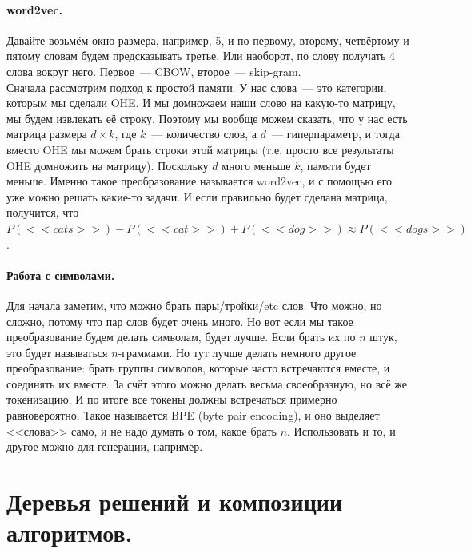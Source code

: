 \documentclass{article}
\begin{document}
    \paragraph{word2vec.}
    Давайте возьмём окно размера, например, 5, и по первому, второму, четвёртому и пятому словам будем предсказывать третье. Или наоборот, по слову получать 4 слова вокруг него. Первое~--- CBOW, второе~--- skip-gram.\\
    Сначала рассмотрим подход к простой памяти. У нас слова~--- это категории, которым мы сделали OHE. И мы домножаем наши слово на какую-то матрицу, мы будем извлекать её строку. Поэтому мы вообще можем сказать, что у нас есть матрица размера $d\times k$, где $k$~--- количество слов, а $d$~--- гиперпараметр, и тогда вместо OHE мы можем брать строки этой матрицы (т.е. просто все результаты OHE домножить на матрицу). Поскольку $d$ много меньше $k$, памяти будет меньше. Именно такое преобразование называется word2vec, и с помощью его уже можно решать какие-то задачи. И если правильно будет сделана матрица, получится, что $P(<<cats>>)-P(<<cat>>)+P(<<dog>>)\approx P(<<dogs>>)$.
    \paragraph{Работа с символами.}
    Для начала заметим, что можно брать пары/тройки/etc слов. Что можно, но сложно, потому что пар слов будет очень много. Но вот если мы такое преобразование будем делать символам, будет лучше. Если брать их по $n$ штук, это будет называться $n$-граммами. Но тут лучше делать немного другое преобразование: брать группы символов, которые часто встречаются вместе, и соединять их вместе. За счёт этого можно делать весьма своеобразную, но всё же токенизацию. И по итоге все токены должны встречаться примерно равновероятно. Такое называется BPE (byte pair encoding), и оно выделяет <<слова>> само, и не надо думать о том, какое брать $n$. Использовать и то, и другое можно для генерации, например.
    \section{Деревья решений и композиции алгоритмов.}
\end{document}
